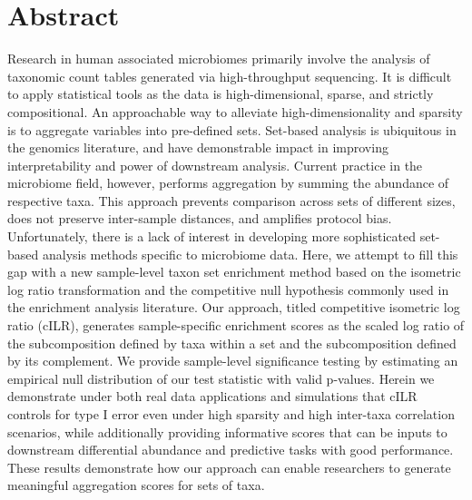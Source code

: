 \documentclass[10pt,letterpaper]{article}
\begin{document}
\section*{Abstract}
Research in human associated microbiomes primarily involve the analysis of taxonomic count tables generated via high-throughput sequencing. It is difficult to apply statistical tools as the data is high-dimensional, sparse, and strictly compositional. An approachable way to alleviate high-dimensionality and sparsity is to aggregate variables into pre-defined sets. Set-based analysis is ubiquitous in the genomics literature, and have demonstrable impact in improving interpretability and power of downstream analysis. Current practice in the microbiome field, however, performs aggregation by summing the abundance of respective taxa. This approach prevents comparison across sets of different sizes, does not preserve inter-sample distances, and amplifies protocol bias. Unfortunately, there is a lack of interest in developing more sophisticated set-based analysis methods specific to microbiome data. Here, we attempt to fill this gap with a new sample-level taxon set enrichment method based on the isometric log ratio transformation and the competitive null hypothesis commonly used in the enrichment analysis literature. Our approach, titled competitive isometric log ratio (cILR), generates sample-specific enrichment scores as the scaled log ratio of the subcomposition defined by taxa within a set and the subcomposition defined by its complement. We provide sample-level significance testing by estimating an empirical null distribution of our test statistic with valid p-values. Herein we demonstrate under both real data applications and simulations that cILR controls for type I error even under high sparsity and high inter-taxa correlation scenarios, while additionally providing informative scores that can be inputs to downstream differential abundance and predictive tasks with good performance. These results demonstrate how our approach can enable researchers to generate meaningful aggregation scores for sets of taxa. 


\end{document}
